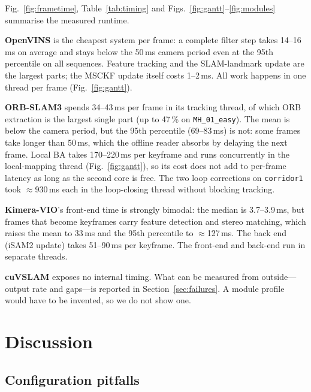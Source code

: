 \documentclass[conference,a4paper]{IEEEtran}
\newcommand{\ds}[1]{\texttt{#1}}
\newcommand{\MHe}{\ds{MH\_01\_easy}}
\newcommand{\corr}{\ds{corridor1}}
\begin{document}
Fig.~\ref{fig:frametime}, Table~\ref{tab:timing} and Figs.~\ref{fig:gantt}--\ref{fig:modules}
summarise the measured runtime.

\textbf{OpenVINS} is the cheapest system per frame: a complete filter step takes
14--16\,ms on average and stays below the 50\,ms camera period even at the 95th percentile on
all sequences. Feature tracking and the SLAM-landmark update are the largest parts; the MSCKF
update itself costs 1--2\,ms. All work happens in one thread per frame (Fig.~\ref{fig:gantt}).

\textbf{ORB-SLAM3} spends 34--43\,ms per frame in its tracking thread, of which ORB extraction is
the largest single part (up to 47\,\% on \MHe{}). The mean is below the camera period, but the
95th percentile (69--83\,ms) is not: some frames take longer than 50\,ms, which the offline
reader absorbs by delaying the next frame. Local BA takes 170--220\,ms per keyframe and runs
concurrently in the local-mapping thread (Fig.~\ref{fig:gantt}), so its cost does not add to
per-frame latency as long as the second core is free. The two loop corrections on \corr{} took
$\approx$930\,ms each in the loop-closing thread without blocking tracking.

\textbf{Kimera-VIO}'s front-end time is strongly bimodal: the median is 3.7--3.9\,ms, but frames
that become keyframes carry feature detection and stereo matching, which raises the mean to
33\,ms and the 95th percentile to $\approx$127\,ms. The back end (iSAM2 update) takes
51--90\,ms per keyframe. The front-end and back-end run in separate threads.

\textbf{cuVSLAM} exposes no internal timing. What can be measured from outside---output rate and
gaps---is reported in Section~\ref{sec:failures}. A module profile would have to be invented,
so we do not show one.

\section{Discussion}

\subsection{Configuration pitfalls}
\label{sec:pitfalls}
\end{document}
